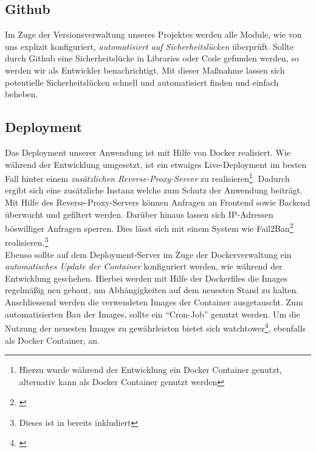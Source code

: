\subsection{Github}

Im Zuge der Versionsverwaltung unseres Projektes werden alle Module, wie von uns explizit konfiguriert, \textit{automatisiert auf Sicherheitslücken} überprüft.
Sollte durch Github eine Sicherheitslücke in Libraries oder Code gefunden werden, so werden wir als Entwickler benachrichtigt.
Mit dieser Maßnahme lassen sich potentielle Sicherheitslücken schnell und automatisiert finden und einfach beheben.\\

\subsection{Deployment}

Das Deployment unserer Anwendung ist mit Hilfe von Docker realisiert.
Wie während der Entwicklung umgesetzt, ist ein etwaiges Live-Deployment im besten Fall hinter einem \textit{zusätzlichen Reverse-Proxy-Server} zu realisieren\footnote{Hierzu wurde während der Entwicklung ein \cite{swag} Docker Container genutzt, alternativ kann \cite{traefik} als Docker Container genutzt werden}.
Dadurch ergibt sich eine zusätzliche Instanz welche zum Schutz der Anwendung beiträgt. Mit Hilfe des Reverse-Proxy-Servers können Anfragen an Frontend sowie Backend überwacht und gefiltert werden.
Darüber hinaus lassen sich IP-Adressen böswilliger Anfragen sperren.
Dies lässt sich mit einem System wie Fail2Ban\footnote{\cite{Fail2Ban}} realisieren.\footnote{Dieses ist in \cite{swag} bereits inkludiert}\\
Ebenso sollte auf dem Deployment-Server im Zuge der Dockerverwaltung ein \textit{automatisches Update der Container} konfiguriert werden, wie während der Entwicklung geschehen.
Hierbei werden mit Hilfe der Dockerfiles die Images regelmäßig neu gebaut, um Abhängigkeiten auf dem neuesten Stand zu halten.
Anschliessend werden die verwendeten Images der Container ausgetauscht.
Zum automatisierten Bau der Images, sollte ein \enquote{Cron-Job} genutzt werden.
Um die Nutzung der neuesten Images zu gewährleisten bietet sich watchtower\footnote{\cite{watchtower}}, ebenfalls als Docker Container, an.
